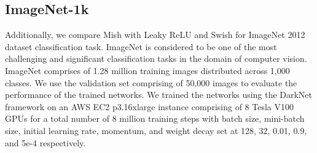 \documentclass{bmvc2k}
\begin{document}
\subsection{ImageNet-1k}
\label{subsec:imagenet}

Additionally, we compare Mish with Leaky ReLU \cite{maas2013rectifier} and Swish for ImageNet 2012 dataset classification task. ImageNet \cite{deng2009imagenet} is considered to be one of the most challenging and significant classification tasks in the domain of computer vision. ImageNet comprises of 1.28 million training images distributed across 1,000 classes. We use the validation set comprising of 50,000 images to evaluate the performance of the trained networks. We trained the networks using the DarkNet framework \cite{darknet13} on an AWS EC2 p3.16xlarge instance comprising of 8 Tesla V100 GPUs for a total number of 8 million training steps with batch size, mini-batch size, initial learning rate, momentum, and weight decay set at 128, 32, 0.01, 0.9, and 5e-4 respectively.
\end{document}
